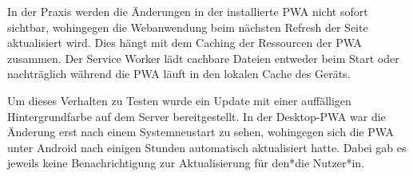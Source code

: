In der Praxis werden die Änderungen in der installierte PWA nicht sofort sichtbar, wohingegen die Webanwendung beim nächsten Refresh der Seite aktualisiert wird. Dies hängt mit dem Caching der Ressourcen der PWA zusammen. Der Service Worker lädt cachbare Dateien entweder beim Start oder nachträglich während die PWA läuft in den lokalen Cache des Geräts.

Um dieses Verhalten zu Testen wurde ein Update mit einer auffälligen Hintergrundfarbe auf dem Server bereitgestellt. In der Desktop-PWA war die Änderung erst nach einem Systemneustart zu sehen, wohingegen sich die PWA unter Android nach einigen Stunden automatisch aktualisiert hatte. Dabei gab es jeweils keine Benachrichtigung zur Aktualisierung für den*die Nutzer*in.






